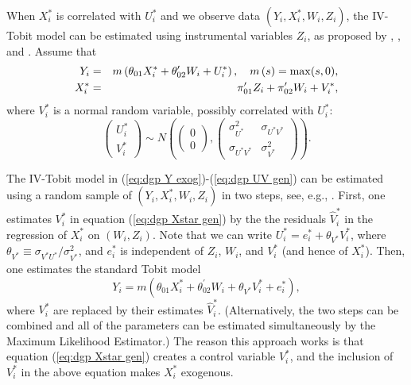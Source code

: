 \documentclass[11pt]{article}
\begin{document}
When $X_{i}^{\ast }$ is correlated with $U_{i}^{\ast }$ and we observe data $%
\left( Y_{i},X_{i}^{\ast },W_{i},Z_{i}\right) $, the IV-Tobit model can be
estimated using instrumental variables $Z_{i}$, as proposed by \cite%
{SmithBlundell1986Ecta}, \cite{Newey1987}, and \cite{RiversVuong1988JoE}.
Assume that%
\begin{eqnarray}
Y_{i} &=&m\left( \theta _{01}X_{i}^{\ast }+\theta _{02}^{\prime
}W_{i}+U_{i}^{\ast }\right) ,\text{\quad }m\left( s\right) =\max (s,0),
\label{eq:dgp Y exog} \\
X_{i}^{\ast } &=&\pi _{01}^{\prime }Z_{i}+\pi _{02}^{\prime
}W_{i}+V_{i}^{\ast },  \label{eq:dgp Xstar gen}
\end{eqnarray}%
where $V_{i}^{\ast }$ is a normal random variable, possibly correlated with $%
U_{i}^{\ast }$:%
\begin{equation}
\left( 
\begin{array}{c}
U_{i}^{\ast } \\ 
V_{i}^{\ast }%
\end{array}%
\right) \sim N\left( \left( 
\begin{array}{c}
0 \\ 
0%
\end{array}%
\right) ,%
\begin{pmatrix}
\sigma _{U^{\ast }}^{2} & \sigma _{U^{\ast }V^{\ast }} \\ 
\sigma _{U^{\ast }V^{\ast }} & \sigma _{V^{\ast }}^{2}%
\end{pmatrix}%
\right) .  \label{eq:dgp UV gen}
\end{equation}

The IV-Tobit model in (\ref{eq:dgp Y exog})-(\ref{eq:dgp UV gen}) can be
estimated using a random sample of $\left( Y_{i},X_{i}^{\ast
},W_{i},Z_{i}\right) $ in two steps, see, e.g., \cite{Wooldridge2010Book}.
First, one estimates $V_{i}^{\ast }$ in equation (\ref{eq:dgp Xstar gen}) by
the the residuals $\hat{V}_{i}^{\ast }$ in the regression of $X_{i}^{\ast }$
on $\left( W_{i},Z_{i}\right) $. Note that we can write $U_{i}^{\ast
}=e_{i}^{\ast }+\theta _{V^{\ast }}V_{i}^{\ast }$, where $\theta _{V^{\ast
}}\equiv \sigma _{V^{\ast }U^{\ast }}/\sigma _{V^{\ast }}^{2}$, and $%
e_{i}^{\ast }$ is independent of $Z_{i}$, $W_{i}$, and $V_{i}^{\ast }$ (and
hence of $X_{i}^{\ast }$). Then, one estimates the standard Tobit model 
\begin{equation*}
Y_{i}=m\left( \theta _{01}X_{i}^{\ast }+\theta _{02}^{\prime }W_{i}+\theta
_{V^{\ast }}V_{i}^{\ast }+e_{i}^{\ast }\right) ,
\end{equation*}%
where $V_{i}^{\ast }$ are replaced by their estimates $\hat{V}_{i}^{\ast }$.
(Alternatively, the two steps can be combined and all of the parameters can
be estimated simultaneously by the Maximum Likelihood Estimator.) The reason
this approach works is that equation (\ref{eq:dgp Xstar gen}) creates a
control variable $V_{i}^{\ast }$, and the inclusion of $V_{i}^{\ast }$ in
the above equation makes $X_{i}^{\ast }$ exogenous. {}
\end{document}
